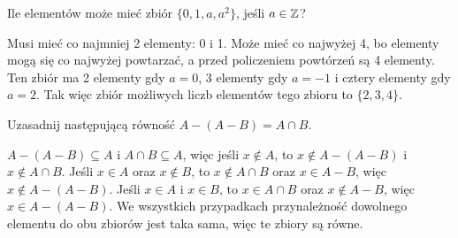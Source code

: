 \documentclass{../note}
\begin{document}
\begin{zadanie}{1}
Ile elementów może mieć zbiór $\{0, 1, a, a^2\}$, jeśli $a \in \mathbb{Z}$?
\end{zadanie}
\begin{rozwiazanie}
Musi mieć co najmniej 2 elementy: 0 i 1. Może mieć co najwyżej 4, bo elementy mogą się co najwyżej powtarzać, a przed policzeniem powtórzeń są 4 elementy. Ten zbiór ma 2 elementy gdy $a = 0$, 3 elementy gdy $a = -1$ i cztery elementy gdy $a = 2$. Tak więc zbiór możliwych liczb elementów tego zbioru to $\{2, 3, 4\}$.
\end{rozwiazanie}

\begin{zadanie}{2}
Uzasadnij następującą równość $A - (A - B) = A \cap B$.
\end{zadanie}
\begin{rozwiazanie}
$A - (A - B) \subseteq A$ i $A \cap B \subseteq A$, więc jeśli $x \notin A$, to $x \notin A - (A - B)$ i $x \notin A \cap B$. Jeśli $x \in A$ oraz $x \notin B$, to $x \notin A \cap B$ oraz $x \in A - B$, więc $x \notin A - (A - B)$. Jeśli $x \in A$ i $x \in B$, to $x \in A \cap B$ oraz $x \notin A - B$, więc $x \in A - (A - B)$. We wszystkich przypadkach przynależność dowolnego elementu do obu zbiorów jest taka sama, więc te zbiory są równe.
\end{rozwiazanie}
\end{document}

